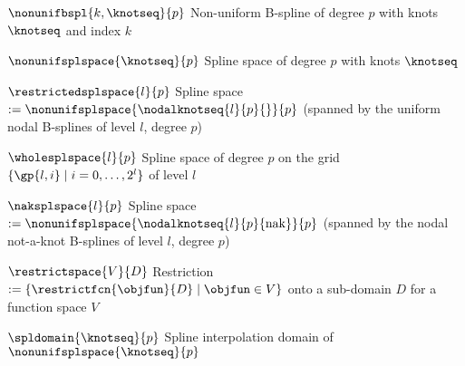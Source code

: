 


%
{$\nonunifbspl{k,\knotseq}{p}$}{
  Non-uniform B-spline of degree $p$ with knots $\knotseq$ and index $k$
}

%
{$\nonunifsplspace{\knotseq}{p}$}{
  Spline space of degree $p$ with knots $\knotseq$
}

%
{$\restrictedsplspace{l}{p}$}{
  Spline space $:= \nonunifsplspace{\nodalknotseq{l}{p}{}}{p}$
  (spanned by the uniform nodal B-splines of level $l$, degree $p$)
}

%
{$\wholesplspace{l}{p}$}{
  Spline space of degree $p$ on the grid
  $\{\gp{l,i} \mid i = 0, \dotsc, 2^l\}$ of level $l$
}

%
{$\naksplspace{l}{p}$}{
  Spline space $:= \nonunifsplspace{\nodalknotseq{l}{p}{\notaknot}}{p}$
  (spanned by the nodal not-a-knot B-splines of level $l$, degree $p$)
}



%
{$\restrictspace{V}{D}$}{
  Restriction $:= \{\restrictfcn{\objfun}{D} \mid \objfun \in V\}$ onto a sub-domain $D$
  for a function space $V$
}

%
{$\spldomain{\knotseq}{p}$}{
  Spline interpolation domain of $\nonunifsplspace{\knotseq}{p}$
}


